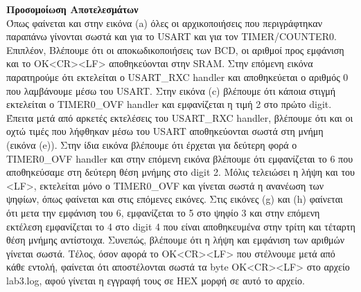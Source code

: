 \documentclass{article}
\begin{document}
	\noindent
	\textbf{Προσομοίωση Αποτελεσμάτων} \\
	\noindent
	Όπως φαίνεται και στην εικόνα (a) όλες οι αρχικοποιήσεις που περιγράφτηκαν παραπάνω γίνονται σωστά και για το USART και για τον TIMER/COUNTER0. Επιπλέον, Βλέπουμε ότι οι αποκωδικοποιήσεις των BCD, οι αριθμοί προς εμφάνιση και το OK<CR><LF> αποθηκεύονται στην SRAM. Στην επόμενη εικόνα παρατηρούμε ότι εκτελείται ο USART\_RXC handler και αποθηκεύεται ο αριθμός 0 που λαμβάνουμε μέσω του USART. Στην εικόνα (c) βλέπουμε ότι κάποια στιγμή εκτελείται ο TIMER0\_OVF handler και εμφανίζεται η τιμή 2 στο πρώτο digit. Έπειτα μετά από αρκετές εκτελέσεις του USART\_RXC handler, βλέπουμε ότι και οι οχτώ τιμές που λήφθηκαν μέσω του USART αποθηκεύονται σωστά στη μνήμη (εικόνα (e)). Στην ίδια εικόνα βλέπουμε ότι έρχεται για δεύτερη φορά ο TIMER0\_OVF handler και στην επόμενη εικόνα βλέπουμε ότι εμφανίζεται το 6 που αποθηκεύσαμε στη δεύτερη θέση μνήμης στο digit 2. Μόλις τελειώσει η λήψη και του <LF>, εκτελείται μόνο ο TIMER0\_OVF και γίνεται σωστά η ανανέωση των ψηφίων, όπως φαίνεται και στις επόμενες εικόνες. Στις εικόνες (g) και (h) φαίνεται ότι μετα την εμφάνιση του 6, εμφανίζεται το 5 στο ψηφίο 3 και στην επόμενη εκτέλεση εμφανίζεται το 4 στο digit 4 που είναι αποθηκευμένα στην τρίτη και τέταρτη θέση μνήμης αντίστοιχα. Συνεπώς, βλέπουμε ότι η λήψη και εμφάνιση των αριθμών γίνεται σωστά. Τέλος, όσον αφορά το OK<CR><LF> που στέλνουμε μετά από κάθε εντολή, φαίνεται ότι αποστέλονται σωστά τα byte OK<CR><LF> στο αρχείο lab3.log, αφού γίνεται η εγγραφή τους σε HEX μορφή σε αυτό το αρχείο.\\
	
\end{document}
